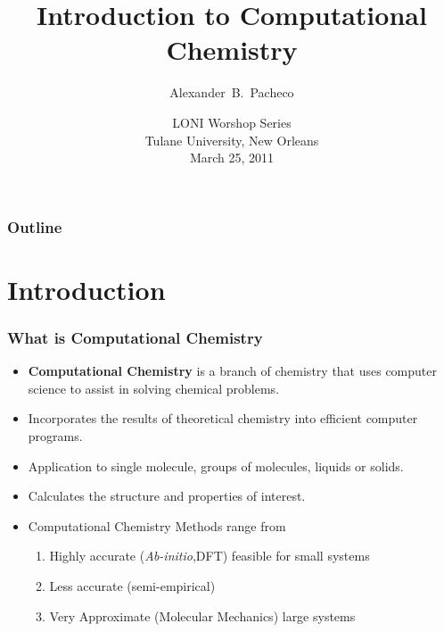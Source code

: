 \documentclass[slidestop,mathserif,compress,xcolor=svgnames]{beamer}
\title[Comp. Chem.]{Introduction to Computational Chemistry}
\author[Alex Pacheco]{\large{Alexander~B.~Pacheco}}
\institute[High Performance Computing @ Louisiana State University - http://www.hpc.lsu.edu] {\inst{}\footnotesize{User Services Consultant\\LSU HPC \& LONI\\sys-help@loni.org}}
\date[\hfill{March 25, 2011\hspace{2cm}\insertframenumber/\inserttotalframenumber}]{\scriptsize{LONI Worshop Series\\Tulane University, New Orleans\\March 25, 2011}}
\begin{document}
\frame{\titlepage}

\normalsize
\begin{frame}[label=toc,squeeze]
  \footnotesize
  \frametitle{\small{Outline}}
  \tableofcontents
  \tableofcontents[part=1]
  \tableofcontents[part=2]
  \tableofcontents[part=3]
  \tableofcontents[part=4]
  \tableofcontents[part=5]
\end{frame}

\normalsize

\section{Introduction}
\begin{frame}
\frametitle{\small What is Computational Chemistry}
\begin{itemize}
\item {\bf Computational Chemistry} is a branch of chemistry that uses computer science to assist in solving chemical problems.
\item Incorporates the results of theoretical chemistry into efficient computer programs.
\item Application to single molecule, groups of molecules, liquids or solids.
\item Calculates the structure and properties of interest.
\item Computational Chemistry Methods range from
 \begin{enumerate}
  \item Highly accurate ({\it Ab-initio},DFT) feasible for small systems
  \item Less accurate (semi-empirical)
  \item Very Approximate (Molecular Mechanics) large systems
 \end{enumerate}
\end{itemize}
\end{frame}
\end{document}

